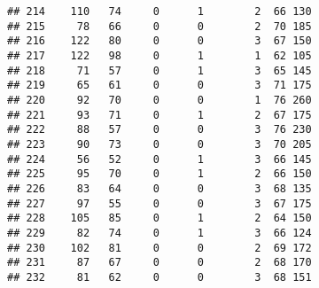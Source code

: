 \documentclass[
]{article}
\newenvironment{Shaded}{\begin{snugshade}}{\end{snugshade}}
\newcommand{\CommentTok}[1]{\textcolor[rgb]{0.56,0.35,0.01}{\textit{#1}}}
\newcommand{\FunctionTok}[1]{\textcolor[rgb]{0.13,0.29,0.53}{\textbf{#1}}}
\newcommand{\NormalTok}[1]{#1}
\newcommand{\OtherTok}[1]{\textcolor[rgb]{0.56,0.35,0.01}{#1}}
\newcommand{\SpecialCharTok}[1]{\textcolor[rgb]{0.81,0.36,0.00}{\textbf{#1}}}
\begin{document}
\begin{verbatim}
## 214    110   74     0      1        2  66 130
## 215     78   66     0      0        2  70 185
## 216    122   80     0      0        3  67 150
## 217    122   98     0      1        1  62 105
## 218     71   57     0      1        3  65 145
## 219     65   61     0      0        3  71 175
## 220     92   70     0      0        1  76 260
## 221     93   71     0      1        2  67 175
## 222     88   57     0      0        3  76 230
## 223     90   73     0      0        3  70 205
## 224     56   52     0      1        3  66 145
## 225     95   70     0      1        2  66 150
## 226     83   64     0      0        3  68 135
## 227     97   55     0      0        3  67 175
## 228    105   85     0      1        2  64 150
## 229     82   74     0      1        3  66 124
## 230    102   81     0      0        2  69 172
## 231     87   67     0      0        2  68 170
## 232     81   62     0      0        3  68 151
\end{verbatim}

\begin{Shaded}
\end{Shaded}
\end{document}
